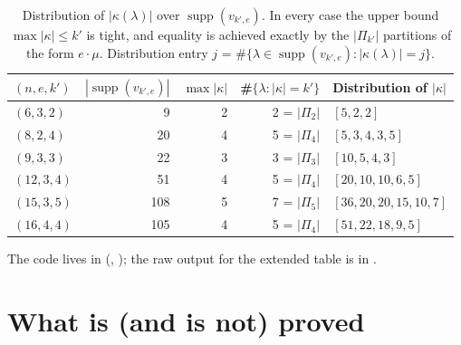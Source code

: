 \documentclass[11pt]{article}
\theoremstyle{definition}
\newcommand{\supp}{\operatorname{supp}}
\begin{document}
\begin{table}[h]
\centering
\begin{tabular}{@{}lrrrl@{}}
\toprule
$(n, e, k')$ & $|\supp(v_{k',e})|$ & $\max |\kappa|$ & \#$\{\lambda:|\kappa|=k'\}$ & Distribution of $|\kappa|$ \\
\midrule
$(6, 3, 2)$   & 9   & 2 & 2 = $|\Pi_2|$ & $[5, 2, 2]$ \\
$(8, 2, 4)$   & 20  & 4 & 5 = $|\Pi_4|$ & $[5, 3, 4, 3, 5]$ \\
$(9, 3, 3)$   & 22  & 3 & 3 = $|\Pi_3|$ & $[10, 5, 4, 3]$ \\
$(12, 3, 4)$  & 51  & 4 & 5 = $|\Pi_4|$ & $[20, 10, 10, 6, 5]$ \\
$(15, 3, 5)$  & 108 & 5 & 7 = $|\Pi_5|$ & $[36, 20, 20, 15, 10, 7]$ \\
$(16, 4, 4)$  & 105 & 4 & 5 = $|\Pi_4|$ & $[51, 22, 18, 9, 5]$ \\
\bottomrule
\end{tabular}
\caption{Distribution of $|\kappa(\lambda)|$ over $\supp(v_{k',e})$. In every
case the upper bound $\max |\kappa| \le k'$ is tight, and equality is achieved
exactly by the $|\Pi_{k'}|$ partitions of the form $e \cdot \mu$.
Distribution entry $j$ = \#$\{\lambda \in \supp(v_{k',e}) : |\kappa(\lambda)|
= j\}$.}
\end{table}

The code lives in
(, ); the raw output for the
extended table is in .

\section{What is (and is not) proved}
\label{sec:gaps}
\end{document}
